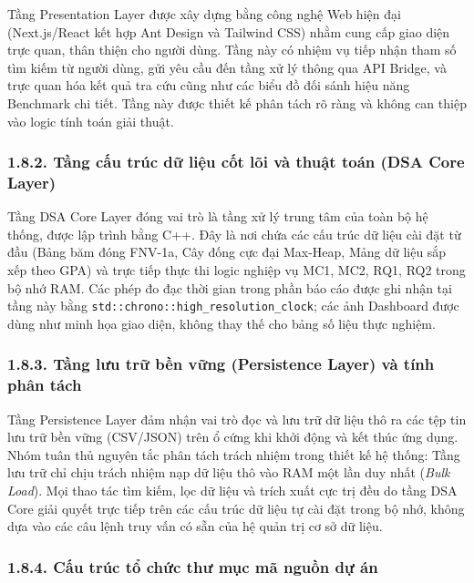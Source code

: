 \documentclass[14pt,a4paper]{extarticle}
\begin{document}
Tầng Presentation Layer được xây dựng bằng công nghệ Web hiện đại (Next.js/React kết hợp Ant Design và Tailwind CSS) nhằm cung cấp giao diện trực quan, thân thiện cho người dùng. Tầng này có nhiệm vụ tiếp nhận tham số tìm kiếm từ người dùng, gửi yêu cầu đến tầng xử lý thông qua API Bridge, và trực quan hóa kết quả tra cứu cũng như các biểu đồ đối sánh hiệu năng Benchmark chi tiết. Tầng này được thiết kế phân tách rõ ràng và không can thiệp vào logic tính toán giải thuật.

\subsubsection*{1.8.2. Tầng cấu trúc dữ liệu cốt lõi và thuật toán (DSA Core Layer)}
{}

Tầng DSA Core Layer đóng vai trò là tầng xử lý trung tâm của toàn bộ hệ thống, được lập trình bằng C++. Đây là nơi chứa các cấu trúc dữ liệu cài đặt từ đầu (Bảng băm đóng FNV-1a, Cây đống cực đại Max-Heap, Mảng dữ liệu sắp xếp theo GPA) và trực tiếp thực thi logic nghiệp vụ MC1, MC2, RQ1, RQ2 trong bộ nhớ RAM. Các phép đo đạc thời gian trong phần báo cáo được ghi nhận tại tầng này bằng \texttt{std::}\allowbreak\texttt{chrono::}\allowbreak\texttt{high\_}\allowbreak\texttt{resolution\_clock}; các ảnh Dashboard được dùng như minh họa giao diện, không thay thế cho bảng số liệu thực nghiệm.

\subsubsection*{1.8.3. Tầng lưu trữ bền vững (Persistence Layer) và tính phân tách}
{}

Tầng Persistence Layer đảm nhận vai trò đọc và lưu trữ dữ liệu thô ra các tệp tin lưu trữ bền vững (CSV/JSON) trên ổ cứng khi khởi động và kết thúc ứng dụng. Nhóm tuân thủ nguyên tắc phân tách trách nhiệm trong thiết kế hệ thống: Tầng lưu trữ chỉ chịu trách nhiệm nạp dữ liệu thô vào RAM một lần duy nhất (\textit{Bulk Load}). Mọi thao tác tìm kiếm, lọc dữ liệu và trích xuất cực trị đều do tầng DSA Core giải quyết trực tiếp trên các cấu trúc dữ liệu tự cài đặt trong bộ nhớ, không dựa vào các câu lệnh truy vấn có sẵn của hệ quản trị cơ sở dữ liệu.

\newpage
\subsubsection*{1.8.4. Cấu trúc tổ chức thư mục mã nguồn dự án}
{}
\end{document}
